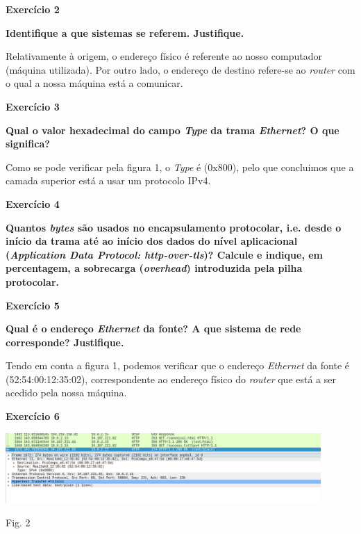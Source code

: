 \documentclass{article}
\begin{document}
\vspace{0.5cm}
{\textbf{Exercício 2}}\vspace{0.5cm}

\textbf{Identifique a que sistemas se referem. Justifique.}\vspace{0.35cm}

\hspace{0.5cm}Relativamente à origem, o endereço físico é referente ao nosso computador (máquina utilizada). Por outro lado, o endereço de destino refere-se ao \textit{router} com o qual a nossa máquina está a comunicar.

\vspace{0.5cm}
{\textbf{Exercício 3}}\vspace{0.5cm}

\textbf{Qual o valor hexadecimal do campo \textit{Type} da trama \textit{Ethernet}? O que significa?}\vspace{0.35cm}

\hspace{0.5cm}Como se pode verificar pela figura 1, o \textit{Type} é (0x800), pelo que concluimos que a camada superior está a usar um protocolo IPv4.

\vspace{0.5cm}
{\textbf{Exercício 4}}\vspace{0.5cm}

\textbf{Quantos \textit{bytes} são usados no encapsulamento protocolar, i.e. desde o início da trama até ao início dos dados do nível
aplicacional (\textit{Application Data Protocol: http-over-tls})? Calcule e indique, em percentagem, a sobrecarga (\textit{overhead})
introduzida pela pilha protocolar.}

\clearpage
{\textbf{Exercício 5}}\vspace{0.5cm}

\textbf{Qual é o endereço \textit{Ethernet} da fonte? A que sistema de rede corresponde? Justifique.}\vspace{0.35cm}

\hspace{0.5cm}Tendo em conta a figura 1, podemos verificar que o endereço \textit{Ethernet} da fonte é (52:54:00:12:35:02), correspondente ao endereço físico do \textit{router} que está a ser acedido pela nossa máquina.

\vspace{0.5cm}
{\textbf{Exercício 6}}\vspace{0.5cm}

\vspace{0.5cm}
\begin{center}
\includegraphics[width = 12cm]{4.png}

\caption{Fig. 2}
\end{center}
\end{document}
